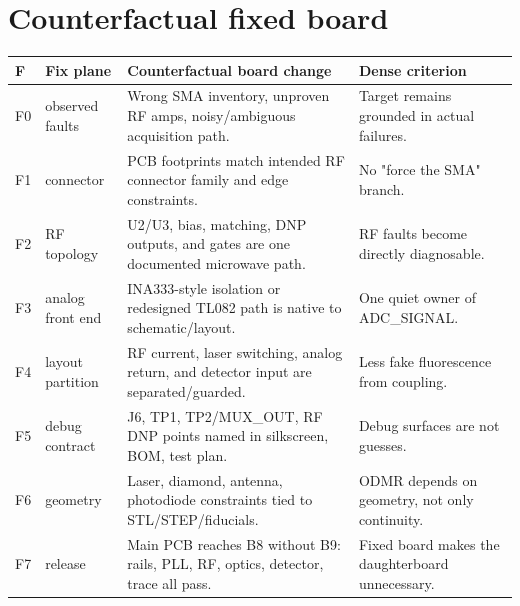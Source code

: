 \documentclass[10pt]{article}
\begin{document}
\section{Counterfactual fixed board}

\begin{center}
\end{center}

\begin{center}\scriptsize
\begin{tabular}{|L{0.35in}|L{1.0in}|L{2.45in}|L{2.1in}|}
\hline
\textbf{F} & \textbf{Fix plane} & \textbf{Counterfactual board change} & \textbf{Dense criterion} \\
\hline
F0 & observed faults & Wrong SMA inventory, unproven RF amps, noisy/ambiguous acquisition path. & Target remains grounded in actual failures. \\
\hline
F1 & connector & PCB footprints match intended RF connector family and edge constraints. & No "force the SMA" branch. \\
\hline
F2 & RF topology & U2/U3, bias, matching, DNP outputs, and gates are one documented microwave path. & RF faults become directly diagnosable. \\
\hline
F3 & analog front end & INA333-style isolation or redesigned TL082 path is native to schematic/layout. & One quiet owner of ADC\_SIGNAL. \\
\hline
F4 & layout partition & RF current, laser switching, analog return, and detector input are separated/guarded. & Less fake fluorescence from coupling. \\
\hline
F5 & debug contract & J6, TP1, TP2/MUX\_OUT, RF DNP points named in silkscreen, BOM, test plan. & Debug surfaces are not guesses. \\
\hline
F6 & geometry & Laser, diamond, antenna, photodiode constraints tied to STL/STEP/fiducials. & ODMR depends on geometry, not only continuity. \\
\hline
F7 & release & Main PCB reaches B8 without B9: rails, PLL, RF, optics, detector, trace all pass. & Fixed board makes the daughterboard unnecessary. \\
\hline
\end{tabular}
\end{center}
\end{document}
